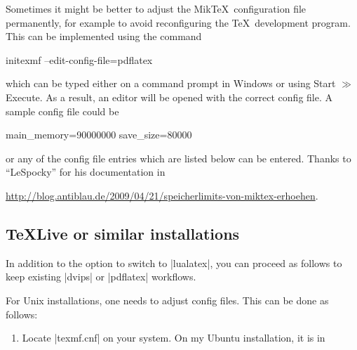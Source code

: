 {Sometimes it might be better to adjust the Mik\TeX\ configuration file permanently, for example to avoid reconfiguring the \TeX\ development program. This can be implemented using the command
\begin{codeexample}
initexmf --edit-config-file=pdflatex
\end{codeexample}
\noindent which can be typed either on a command prompt in Windows or using Start $\gg$ Execute. As a result, an editor will be opened with the correct config file. A sample config file could be
\begin{codeexample}
main_memory=90000000
save_size=80000
\end{codeexample}
or any of the config file entries which are listed below can be entered. 
Thanks to ``LeSpocky'' for his documentation in

\url{http://blog.antiblau.de/2009/04/21/speicherlimits-von-miktex-erhoehen}.

\subsection{\TeX Live or similar installations}
In addition to the option to switch to |lualatex|, you can proceed as follows to keep existing |dvips| or |pdflatex| workflows.

For Unix installations, one needs to adjust config files. This can be done as follows:
\begin{enumerate}
	\item Locate |texmf.cnf| on your system. On my Ubuntu installation, it is in 
	

\end{enumerate}}

